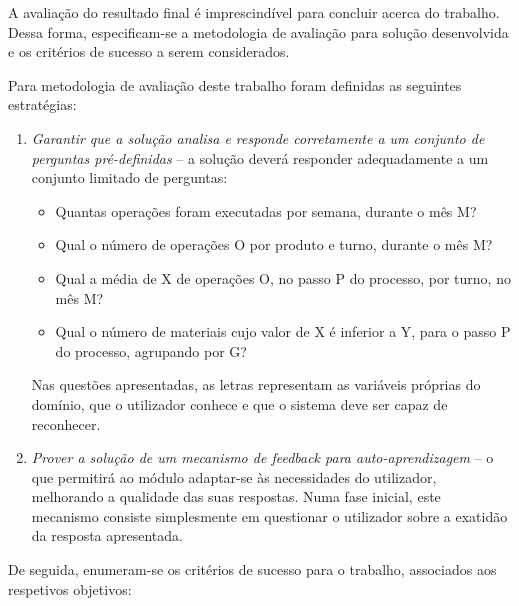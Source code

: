 A avaliação do resultado final é imprescindível para concluir acerca do trabalho. Dessa forma, especificam-se a metodologia de avaliação para solução desenvolvida e os critérios de sucesso a serem considerados.

Para metodologia de avaliação deste trabalho foram definidas as seguintes estratégias:

\begin{enumerate}
\label{enum:pre1_qualitystrategies}
    \item 
    {
        \textit{Garantir que a solução analisa e responde corretamente a um conjunto de perguntas pré-definidas} -- a solução deverá responder adequadamente a um conjunto limitado de perguntas:
        \begin{itemize}
            \item 
            {
                Quantas operações foram executadas por semana, durante o mês M?
            }
            \item
            {
                Qual o número de operações O por produto e turno, durante o mês M?
            }
            \item
            {
                Qual a média de X de operações O, no passo P do processo, por turno, no mês M? 
            }
            \item
            {
                Qual o número de materiais cujo valor de X é inferior a Y, para o passo P do processo, agrupando por G?
            }
        \end{itemize}
        
        Nas questões apresentadas, as letras representam as variáveis próprias do domínio, que o utilizador conhece e que o sistema deve ser capaz de reconhecer.
    }
    \item
    {
        \textit{Prover a solução de um mecanismo de feedback para auto-aprendizagem} -- o que permitirá ao módulo adaptar-se às necessidades do utilizador, melhorando a qualidade das suas respostas. Numa fase inicial, este mecanismo consiste simplesmente em questionar o utilizador sobre a exatidão da resposta apresentada.
    }
\end{enumerate}

De seguida, enumeram-se os critérios de sucesso para o trabalho, associados aos respetivos objetivos:

